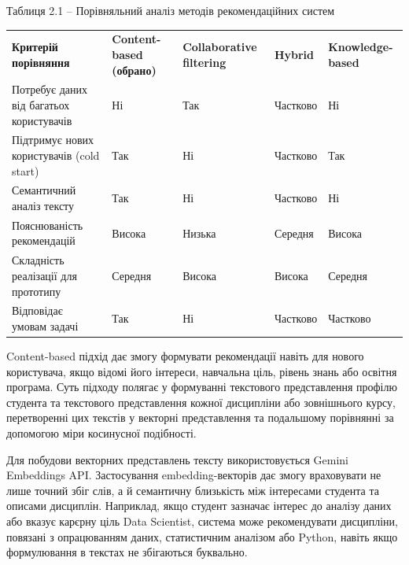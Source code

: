 \documentclass[
]{article}
\newcounter{none} %
\begin{document}
Таблиця 2.1 -- Порівняльний аналіз методів рекомендаційних систем

{\def\LTcaptype{none} %
\begin{longtable}[]{@{}
  >{\raggedright\arraybackslash}p{}
  >{\raggedright\arraybackslash}p{}
  >{\raggedright\arraybackslash}p{}
  >{\raggedright\arraybackslash}p{}
  >{\raggedright\arraybackslash}p{}@{}}
\toprule\noalign{}
\endhead
\bottomrule\noalign{}
\endlastfoot
\textbf{Критерій порівняння} & \textbf{Content-based (обрано)} &
\textbf{Collaborative filtering} & \textbf{Hybrid} &
\textbf{Knowledge-based} \\
Потребує даних від багатьох користувачів & Ні & Так & Частково & Ні \\
Підтримує нових користувачів (cold start) & Так & Ні & Частково & Так \\
Семантичний аналіз тексту & Так & Ні & Частково & Ні \\
Пояснюваність рекомендацій & Висока & Низька & Середня & Висока \\
Складність реалізації для прототипу & Середня & Висока & Висока &
Середня \\
Відповідає умовам задачі & Так & Ні & Частково & Частково \\
\end{longtable}
}

Content-based підхід дає змогу формувати рекомендації навіть для нового
користувача, якщо відомі його інтереси, навчальна ціль, рівень знань або
освітня програма. Суть підходу полягає у формуванні текстового
представлення профілю студента та текстового представлення кожної
дисципліни або зовнішнього курсу, перетворенні цих текстів у векторні
представлення та подальшому порівнянні за допомогою міри косинусної
подібності.

Для побудови векторних представлень тексту використовується Gemini
Embeddings API. Застосування embedding-векторів дає змогу враховувати не
лише точний збіг слів, а й семантичну близькість між інтересами студента
та описами дисциплін. Наприклад, якщо студент зазначає інтерес до
аналізу даних або вказує кар\textquotesingle єрну ціль Data Scientist,
система може рекомендувати дисципліни, пов\textquotesingle язані з
опрацюванням даних, статистичним аналізом або Python, навіть якщо
формулювання в текстах не збігаються буквально.
\end{document}
